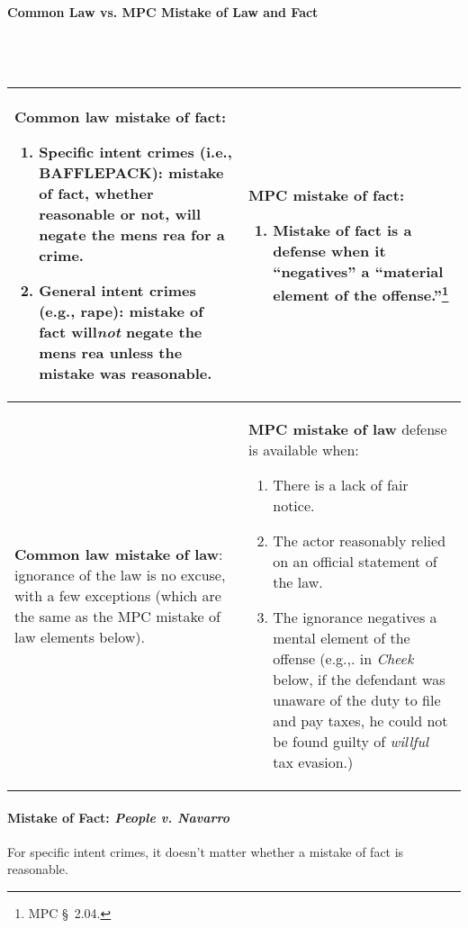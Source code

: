 \paragraph{Common Law vs. MPC Mistake of Law and Fact}
~\\\\
\begin{tabular}{ | p{6cm} | p{6cm} |}
\hline
    \textbf{Common law mistake of fact:}
    \begin{enumerate}
        \item Specific intent crimes (i.e., BAFFLEPACK): mistake of fact, 
        whether reasonable or not, will negate the mens rea for a crime.
        \item General intent crimes (e.g., rape): mistake of fact 
        will\emph{not} negate the mens rea unless the mistake was reasonable.
    \end{enumerate} &
    \textbf{MPC mistake of fact:}
    \begin{enumerate}
        \item Mistake of fact is a defense when it ``negatives'' a ``material 
        element of the offense.''\footnote{MPC \S\ 2.04.}
    \end{enumerate} \\ \hline
    \textbf{Common law mistake of law}: ignorance of the law is no excuse, with a 
    few exceptions (which are the same as the MPC mistake of law elements 
    below). &
    \textbf{MPC mistake of law} defense is available when:
    \begin{enumerate}
        \item There is a lack of fair notice.
        \item The actor reasonably relied on an official statement of the law.
        \item The ignorance negatives a mental element of the offense (e.g.,.  
        in \emph{Cheek} below, if the defendant was unaware of the duty to 
        file and pay taxes, he could not be found guilty of \emph{willful} tax 
        evasion.)
    \end{enumerate} \\
\hline
\end{tabular}

\paragraph{Mistake of Fact: \emph{People v. Navarro}}

For specific intent crimes, it doesn't matter whether a mistake of fact is 
reasonable.

